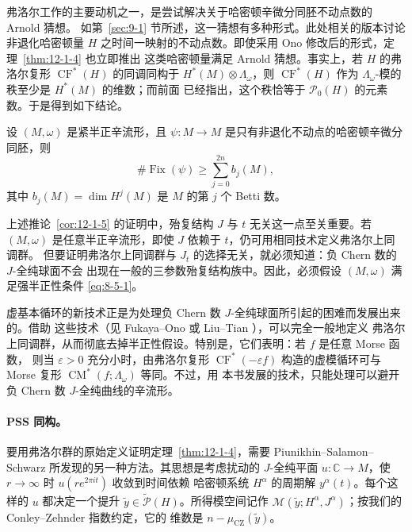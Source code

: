 弗洛尔工作的主要动机之一，是尝试解决关于哈密顿辛微分同胚不动点数的 Arnold 猜想。
如第~\ref{sec:9-1} 节所述，这一猜想有多种形式。此处相关的版本讨论非退化哈密顿量 $H$
之时间一映射的不动点数。即使采用 Ono 修改后的形式，定理~\ref{thm:12-1-4} 也立即推出
这类哈密顿量满足 Arnold 猜想。事实上，若 $H$ 的弗洛尔复形
$\operatorname{CF}^*(H)$ 的同调同构于 $H^*(M)\otimes\Lambda_\omega$，则
$\operatorname{CF}^*(H)$ 作为 $\Lambda_\omega$-模的秩至少是 $H^*(M)$ 的维数；而前面
已经指出，这个秩恰等于 $\mathcal P_0(H)$ 的元素数。于是得到如下结论。

\begin{corollary}\label{cor:12-1-5}
设 $(M,\omega)$ 是紧半正辛流形，且
$\psi:M\to M$ 是只有非退化不动点的哈密顿辛微分同胚，则
\[
  \#\operatorname{Fix}(\psi)\geq\sum_{j=0}^{2n}b_j(M),
\]
其中 $b_j(M)=\dim H^j(M)$ 是 $M$ 的第 $j$ 个 Betti 数。
\end{corollary}

\begin{remark}\label{rem:12-1-6}
上述推论~\ref{cor:12-1-5} 的证明中，殆复结构 $J$ 与 $t$ 无关这一点至关重要。若
$(M,\omega)$ 是任意半正辛流形，即使 $J$ 依赖于 $t$，仍可用相同技术定义弗洛尔上同调群。
但要证明弗洛尔上同调群与 $J_t$ 的选择无关，就必须知道：负 Chern 数的 $J$-全纯球面不会
出现在一般的三参数殆复结构族中。因此，必须假设 $(M,\omega)$ 满足强半正性条件
\eqref{eq:8-5-1}。

虚基本循环的新技术正是为处理负 Chern 数 $J$-全纯球面所引起的困难而发展出来的。借助
这些技术（见 Fukaya--Ono  或 Liu--Tian ），可以完全一般地定义
弗洛尔上同调群，从而彻底去掉半正性假设。特别是，它们表明：若 $f$ 是任意 Morse 函数，
则当 $\varepsilon>0$ 充分小时，由弗洛尔复形 $\operatorname{CF}^*(-\varepsilon f)$
构造的虚模循环可与 Morse 复形 $\operatorname{CM}^*(f;\Lambda_\omega)$ 等同。不过，用
本书发展的技术，只能处理可以避开负 Chern 数 $J$-全纯曲线的辛流形。
\end{remark}

\paragraph{PSS 同构。}
要用弗洛尔群的原始定义证明定理~\ref{thm:12-1-4}，需要
Piunikhin--Salamon--Schwarz  所发现的另一种方法。其思想是考虑扰动的
$J$-全纯平面 $u:\mathbb C\to M$，使 $r\to\infty$ 时 $u(re^{2\pi it})$ 收敛到时间依赖
哈密顿系统 $H^\alpha$ 的周期解 $y^\alpha(t)$。每个这样的 $u$ 都决定一个提升
$\widetilde y\in\widetilde{\mathcal P}(H)$。所得模空间记作
$\mathcal M(\widetilde y;H^\alpha,J^\alpha)$；按我们的 Conley--Zehnder 指数约定，它的
维数是 $n-\mu_{\mathrm{CZ}}(\widetilde y)$。

